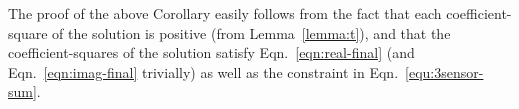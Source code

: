 \begin{prf}
The proof of the above Corollary easily follows from the fact that each 
coefficient-square of the solution is positive (from Lemma~\ref{lemma:t}), and that
the coefficient-squares of the solution satisfy Eqn.~\ref{eqn:real-final} (and Eqn.~\ref{eqn:imag-final} trivially) as well as the constraint in Eqn.~\ref{equ:3sensor-sum}.
\end{prf}